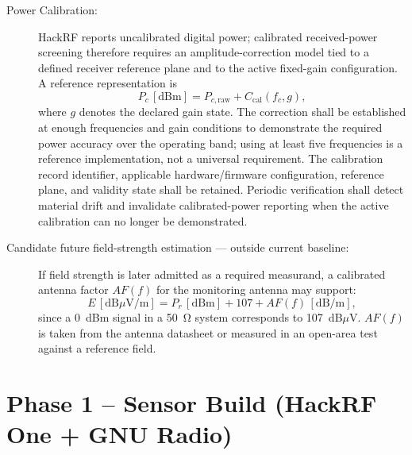 \documentclass[12pt,a4paper]{report}
\newcommand{\dBm}{\ensuremath{\mathrm{dBm}}}
\newcommand{\dBuV}{\ensuremath{\mathrm{dB}\mu\mathrm{V/m}}}
\begin{document}
\begin{description}
 	\item[Power Calibration:] HackRF reports uncalibrated digital power; calibrated received-power screening therefore requires an amplitude-correction model tied to a defined receiver reference plane and to the active fixed-gain configuration. A reference representation is
 	\begin{equation}
 		P_c\,[\dBm] = P_{c,\text{raw}} + C_{\text{cal}}(f_c,g),
 	\end{equation}
 	where $g$ denotes the declared gain state. The correction shall be established at enough frequencies and gain conditions to demonstrate the required power accuracy over the operating band; using at least five frequencies is a reference implementation, not a universal requirement. The calibration record identifier, applicable hardware/firmware configuration, reference plane, and validity state shall be retained. Periodic verification shall detect material drift and invalidate calibrated-power reporting when the active calibration can no longer be demonstrated.
 	\item[Candidate future field-strength estimation --- outside current baseline:] If field strength is later admitted as a required measurand, a calibrated antenna factor $AF(f)$ for the monitoring antenna may support:
 	\begin{equation}
 		E\,[\dBuV] = P_r\,[\dBm] + 107 + AF(f)\,[\mathrm{dB/m}],
 	\end{equation}
 	since a \SI{0}{dBm} signal in a \SI{50}{\ohm} system corresponds to
 	\SI{107}{dB$\mu$V}. $AF(f)$ is taken from the antenna datasheet or measured
 	in an open-area test against a reference field.
 \end{description}
 \section{Phase 1 -- Sensor Build (HackRF One + GNU Radio)}
\end{document}
